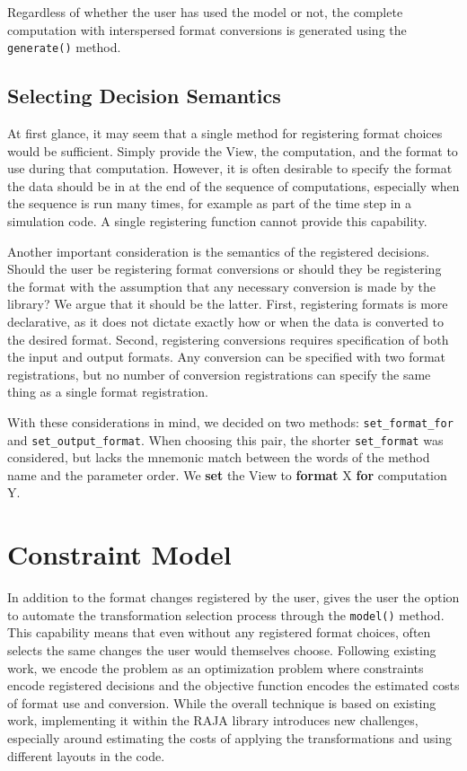 Regardless of whether the user has used the model or not, 
the complete computation with interspersed format conversions is generated using the \verb.generate(). method.

\subsection{Selecting Decision Semantics}

At first glance, it may seem that a single method for registering format choices would be sufficient. 
Simply provide the View, the computation, and the format to use during that computation.
However, it is often desirable to specify the format the data should be in at the end of the sequence of computations, especially when the sequence is run many times, for example as part of the time step in a simulation code.
A single registering function cannot provide this capability. 

Another important consideration is the semantics of the registered decisions. 
Should the user be registering format conversions or should they be registering the format with the assumption that any necessary conversion is made by the library?
We argue that it should be the latter.
First, registering formats is more declarative, as it does not dictate exactly how or when the data is converted to the desired format.
Second, registering conversions requires specification of both the input and output formats. 
Any conversion can be specified with two format registrations, but no number of conversion registrations can specify the same thing as a single format registration.

With these considerations in mind, we decided on two methods: \verb.set_format_for. and \verb.set_output_format..
When choosing this pair, the shorter \verb.set_format. was considered, but lacks the mnemonic match between the words of the method name and the parameter order. We \textbf{set} the View to \textbf{format} X \textbf{for} computation Y. 

\section{Constraint Model}

In addition to the format changes registered by the user, \FormatDecisions{} gives the user the option to automate the transformation selection process through the \verb.model(). method.
This capability means that even without any registered format choices, \FormatDecisions{} often selects the same changes the user would themselves choose.
Following existing work, we encode the problem as an optimization problem where constraints encode registered decisions and the objective function encodes the estimated costs of format use and conversion.
While the overall technique is based on existing work, implementing it within the RAJA library introduces new challenges, especially around estimating the costs of applying the transformations and using different layouts in the code.

